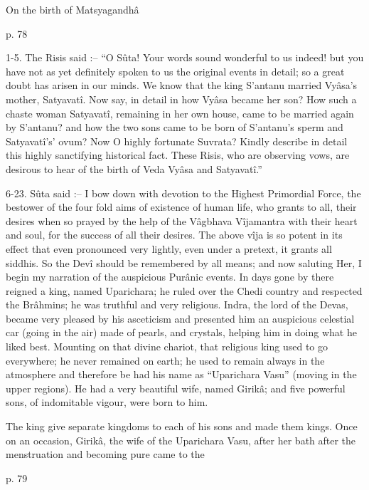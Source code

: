 ﻿On the birth of Matsyagandhâ

 

p. 78

 

1-5. The Risis said :-- “O Sûta! Your words sound wonderful to us indeed! but you have not as yet definitely spoken to us the original events in detail; so a great doubt has arisen in our minds. We know that the king S’antanu married Vyâsa's mother, Satyavatî. Now say, in detail in how Vyâsa became her son? How such a chaste woman Satyavatî, remaining in her own house, came to be married again by S’antanu? and how the two sons came to be born of S’antanu's sperm and Satyavatî's' ovum? Now O highly fortunate Suvrata? Kindly describe in detail this highly sanctifying historical fact. These Risis, who are observing vows, are desirous to hear of the birth of Veda Vyâsa and Satyavatî.”

 

6-23. Sûta said :-- I bow down with devotion to the Highest Primordial Force, the bestower of the four fold aims of existence of human life, who grants to all, their desires when so prayed by the help of the Vâgbhava Vîjamantra with their heart and soul, for the success of all their desires. The above vîja is so potent in its effect that even pronounced very lightly, even under a pretext, it grants all siddhis. So the Devî should be remembered by all means; and now saluting Her, I begin my narration of the auspicious Purânic events. In days gone by there reigned a king, named Uparichara; he ruled over the Chedi country and respected the Brâhmins; he was truthful and very religious. Indra, the lord of the Devas, became very pleased by his asceticism and presented him an auspicious celestial car (going in the air) made of pearls, and crystals, helping him in doing what he liked best. Mounting on that divine chariot, that religious king used to go everywhere; he never remained on earth; he used to remain always in the atmosphere and therefore be had his name as “Uparichara Vasu” (moving in the upper regions). He had a very beautiful wife, named Girikâ; and five powerful sons, of indomitable vigour, were born to him.

 

The king give separate kingdoms to each of his sons and made them kings. Once on an occasion, Girikâ, the wife of the Uparichara Vasu, after her bath after the menstruation and becoming pure came to the

 

p. 79


